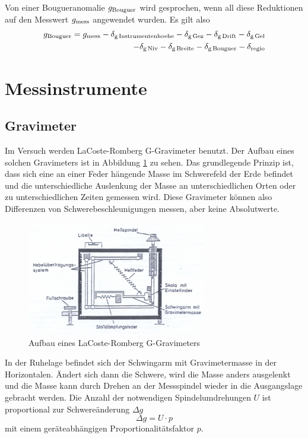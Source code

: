 Von einer Bougueranomalie $g_{\mathrm{Bouguer}}$ wird gesprochen, wenn all diese Reduktionen auf den Messwert $g_{\mathrm{mess}}$ angewendet wurden. Es gilt also
\begin{align}
 g_{\mathrm{Bouguer}}=g_{\mathrm{mess}}-\delta_{\mathrm{g\,Instrumentenhoehe}}-\delta_{\mathrm{g\,Gez}}-\delta_{\mathrm{g\,Drift}}-\delta_{\mathrm{g\,Gel}} \\ \notag
 -\delta_{\mathrm{g\,Niv}}-\delta_{\mathrm{g\,Breite}}-\delta_{\mathrm{g\,Bouguer}}
 -\delta_{\mathrm{regio}}
\end{align}

\section{Messinstrumente}

\subsection{Gravimeter}

Im Versuch werden LaCoste-Romberg G-Gravimeter benutzt. Der Aufbau eines solchen Gravimeters ist in Abbildung \ref{fig:grav} zu sehen. Das grundlegende Prinzip ist, dass sich eine an einer Feder hängende Masse im Schwerefeld der Erde befindet und die unterschiedliche Auslenkung der Masse an unterschiedlichen Orten oder zu unterschiedlichen Zeiten gemessen wird. Diese Gravimeter können also Differenzen von Schwerebeschleunigungen messen, aber keine Absolutwerte.

\begin{figure}
    \centering
   \includegraphics[width=0.7\textwidth]{fig/gravimeter}
 \caption[Aufbau eines LaCoste-Romberg G-Gravimeters]{Aufbau eines LaCoste-Romberg G-Gravimeters \cite{skript}}
 \label{fig:grav}
\end{figure}

In der Ruhelage befindet sich der Schwingarm mit Gravimetermasse in der Horizontalen. Ändert sich dann die Schwere, wird die Masse anders ausgelenkt und die Masse kann durch Drehen an der Messspindel wieder in die Ausgangslage gebracht werden. Die Anzahl der notwendigen Spindelumdrehungen $U$ ist proportional zur Schwereänderung $\Delta g$
\begin{equation}
 \Delta g= U\cdot p
\end{equation}
mit einem geräteabhängigen Proportionalitätsfaktor $p$.

